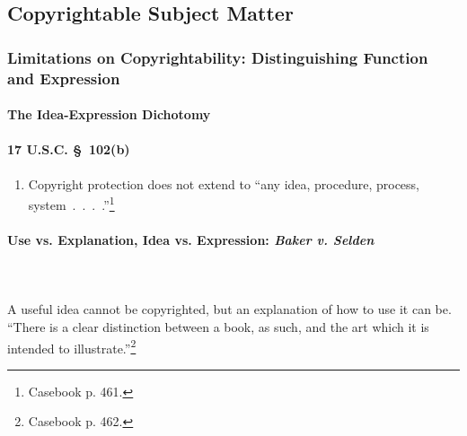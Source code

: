 \subsection{Copyrightable Subject Matter}

\subsubsection{Limitations on Copyrightability: Distinguishing Function and 
Expression}

\paragraph{The Idea-Expression Dichotomy}

\paragraph{17 U.S.C. \S\ 102(b)}

\begin{enumerate}
    \item Copyright protection does not extend to ``any idea, procedure, 
    process, system~.~.~.~.''\footnote{Casebook p. 461.}
\end{enumerate}

\paragraph{Use vs. Explanation, Idea vs. Expression: \emph{Baker v. Selden}}
~\\\\
A useful idea cannot be copyrighted, but an explanation of how to use it can 
be. ``There is a clear distinction between a book, as such, and the art which 
it is intended to illustrate.''\footnote{Casebook p. 462.}

